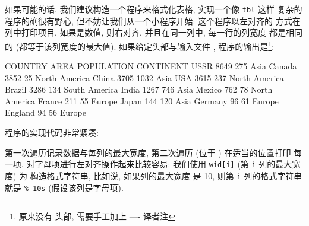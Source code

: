 如果可能的话, 我们建议构造一个程序来格式化表格, 实现一个像 \verb'tbl' 这样 
复杂的程序的确很有野心, 但不妨让我们从一个小程序开始: 这个程序以左对齐的
方式在列中打印项目, 如果是数值, 则右对齐, 并且在同一列中, 每一行的列宽度
都是相同的 (都等于该列宽度的最大值). 如果给定头部与输入文件
, 程序的输出是\footnote{ 原来没有
头部, 需要手工加上 ---- 译者注}:
\begin{shell}
    COUNTRY   AREA   POPULATION   CONTINENT    
    USSR      8649       275      Asia         
    Canada    3852        25      North America
    China     3705      1032      Asia         
    USA       3615       237      North America
    Brazil    3286       134      South America
    India     1267       746      Asia         
    Mexico     762        78      North America
    France     211        55      Europe       
    Japan      144       120      Asia         
    Germany     96        61      Europe       
    England     94        56      Europe       
\end{shell}

程序的实现代码非常紧凑:
第一次遍历记录数据与每列的最大宽度, 第二次遍历 (位于 \END) 在适当的位置打印
每一项. 对字母项进行左对齐操作起来比较容易: 我们使用 \verb'wid[i]' (第 
\verb'i' 列的最大宽度) 为 \printf 构造格式字符串, 比如说, 如果列的最大宽度
是 10, 则第 \verb'i' 列的格式字符串就是 \verb'%-10s' (假设该列是字母项).

